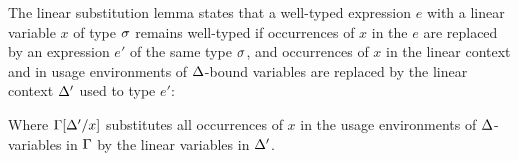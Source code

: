 
The linear substitution lemma states that a well-typed expression $e$ with a
linear variable $x$ of type $\sigma$ remains well-typed if
occurrences of $x$ in the $e$ are replaced by an expression $e'$ of the same
type $\sigma$, and occurrences of $x$ in the linear context and in usage
environments of $\Delta$-bound variables are replaced by the linear context $\Delta'$
used to type $e'$:
\LinearSubstitutionLemma

\noindent Where $\Gamma[\Delta'/x]$ substitutes all occurrences of $x$ in the usage
environments of $\Delta$-variables in $\Gamma$ by the linear variables in $\Delta'$.



